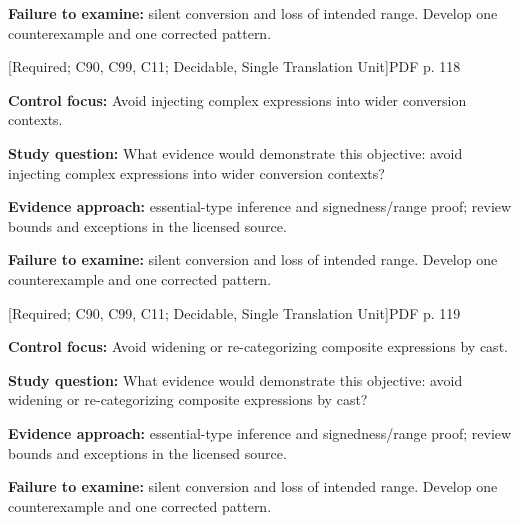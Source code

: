 \documentclass[10pt,letterpaper]{article}
\begin{document}
\textbf{Failure to examine:} silent conversion and loss of intended range. Develop one counterexample and one corrected pattern.\par
\smallskip
{}
 \textsf{\footnotesize [Required; C90, C99, C11; Decidable, Single Translation Unit]}\hfill{\footnotesize PDF p. 118}\par
\textbf{Control focus:} Avoid injecting complex expressions into wider conversion contexts.\par
\textbf{Study question:} What evidence would demonstrate this objective: avoid injecting complex expressions into wider conversion contexts?\par
\textbf{Evidence approach:} essential-type inference and signedness/range proof; review bounds and exceptions in the licensed source.\par
\textbf{Failure to examine:} silent conversion and loss of intended range. Develop one counterexample and one corrected pattern.\par
\smallskip
{}
 \textsf{\footnotesize [Required; C90, C99, C11; Decidable, Single Translation Unit]}\hfill{\footnotesize PDF p. 119}\par
\textbf{Control focus:} Avoid widening or re-categorizing composite expressions by cast.\par
\textbf{Study question:} What evidence would demonstrate this objective: avoid widening or re-categorizing composite expressions by cast?\par
\textbf{Evidence approach:} essential-type inference and signedness/range proof; review bounds and exceptions in the licensed source.\par
\textbf{Failure to examine:} silent conversion and loss of intended range. Develop one counterexample and one corrected pattern.\par
\smallskip
\end{document}
